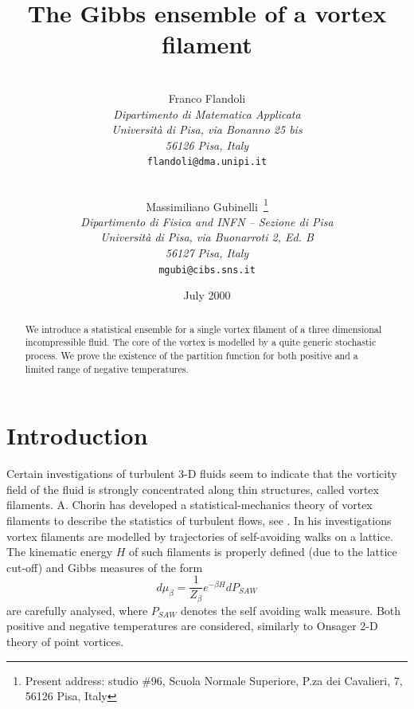 \title{The Gibbs ensemble of a vortex filament
}
\author{
  \\
  { Franco Flandoli }              \\
  {\small\it Dipartimento di Matematica Applicata} \\ 
  {\small\it Universit\`{a} di Pisa, via Bonanno 25 bis} \\
  {\small\it 56126 Pisa, Italy}          \\
  {\small\tt flandoli@dma.unipi.it} \\
  \and \\
  { Massimiliano Gubinelli~\footnote{Present address: studio \#96, Scuola
      Normale Superiore, P.za dei Cavalieri, 7, 56126  Pisa, Italy} }              \\
  {\small\it Dipartimento di Fisica and INFN -- Sezione di Pisa}    \\
  {\small\it Universit\`a di Pisa, via Buonarroti 2, Ed. B}        \\
  {\small\it 56127 Pisa, Italy}          \\
  {\small\tt mgubi@cibs.sns.it} \\
}

\date{July 2000}





\maketitle

\begin{abstract}
We introduce a statistical ensemble for a single vortex
filament of a three dimensional incompressible fluid. 
The core of the vortex is modelled by a quite generic
stochastic process. We prove the existence of the partition function for
both positive and a limited range of negative temperatures.   
\end{abstract}

\section{Introduction}
Certain investigations of turbulent 3-D fluids seem to indicate that the
vorticity field of the fluid is strongly concentrated along thin structures,
called vortex filaments. A. Chorin has developed a statistical-mechanics
theory of vortex filaments to describe the statistics of turbulent flows,
see \cite{Ch}. In his investigations vortex filaments are modelled by
trajectories of self-avoiding walks on a lattice. 
The kinematic energy $H$ of such
filaments is properly defined (due to the lattice cut-off) and Gibbs
measures of the form 
\begin{equation*}
d\mu _{\beta }=\frac{1}{Z_{\beta }}e^{-\beta H}dP_{SAW}
\end{equation*}
are carefully analysed, where $P_{SAW}$ denotes the self avoiding walk
measure. Both positive and negative temperatures are considered, similarly to
Onsager 2-D theory of point vortices.

